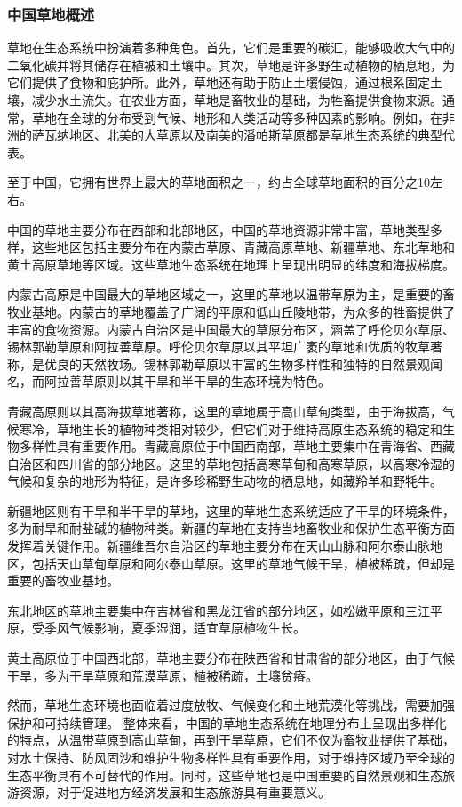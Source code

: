 \documentclass{article}
\begin{document}
	\subsubsection{中国草地概述}
	草地在生态系统中扮演着多种角色。首先，它们是重要的碳汇，能够吸收大气中的二氧化碳并将其储存在植被和土壤中。其次，草地是许多野生动植物的栖息地，为它们提供了食物和庇护所。此外，草地还有助于防止土壤侵蚀，通过根系固定土壤，减少水土流失。在农业方面，草地是畜牧业的基础，为牲畜提供食物来源。通常，草地在全球的分布受到气候、地形和人类活动等多种因素的影响。例如，在非洲的萨瓦纳地区、北美的大草原以及南美的潘帕斯草原都是草地生态系统的典型代表。
	
	至于中国，它拥有世界上最大的草地面积之一，约占全球草地面积的百分之10左右。
	
	中国的草地主要分布在西部和北部地区，中国的草地资源非常丰富，草地类型多样，这些地区包括主要分布在内蒙古草原、青藏高原草地、新疆草地、东北草地和黄土高原草地等区域。这些草地生态系统在地理上呈现出明显的纬度和海拔梯度。
	
	内蒙古高原是中国最大的草地区域之一，这里的草地以温带草原为主，是重要的畜牧业基地。内蒙古的草地覆盖了广阔的平原和低山丘陵地带，为众多的牲畜提供了丰富的食物资源。内蒙古自治区是中国最大的草原分布区，涵盖了呼伦贝尔草原、锡林郭勒草原和阿拉善草原。呼伦贝尔草原以其平坦广袤的草地和优质的牧草著称，是优良的天然牧场。锡林郭勒草原以丰富的生物多样性和独特的自然景观闻名，而阿拉善草原则以其干旱和半干旱的生态环境为特色。
	
	青藏高原则以其高海拔草地著称，这里的草地属于高山草甸类型，由于海拔高，气候寒冷，草地生长的植物种类相对较少，但它们对于维持高原生态系统的稳定和生物多样性具有重要作用。青藏高原位于中国西南部，草地主要集中在青海省、西藏自治区和四川省的部分地区。这里的草地包括高寒草甸和高寒草原，以高寒冷湿的气候和复杂的地形为特征，是许多珍稀野生动物的栖息地，如藏羚羊和野牦牛。
	
	新疆地区则有干旱和半干旱的草地，这里的草地生态系统适应了干旱的环境条件，多为耐旱和耐盐碱的植物种类。新疆的草地在支持当地畜牧业和保护生态平衡方面发挥着关键作用。新疆维吾尔自治区的草地主要分布在天山山脉和阿尔泰山脉地区，包括天山草甸草原和阿尔泰山草原。这里的草地气候干旱，植被稀疏，但却是重要的畜牧业基地。
	
	东北地区的草地主要集中在吉林省和黑龙江省的部分地区，如松嫩平原和三江平原，受季风气候影响，夏季湿润，适宜草原植物生长。
	
	黄土高原位于中国西北部，草地主要分布在陕西省和甘肃省的部分地区，由于气候干旱，多为干旱草原和荒漠草原，植被稀疏，土壤贫瘠。
	
	然而，草地生态环境也面临着过度放牧、气候变化和土地荒漠化等挑战，需要加强保护和可持续管理。 整体来看，中国的草地生态系统在地理分布上呈现出多样化的特点，从温带草原到高山草甸，再到干旱草原，它们不仅为畜牧业提供了基础，对水土保持、防风固沙和维护生物多样性具有重要作用，对于维持区域乃至全球的生态平衡具有不可替代的作用。同时，这些草地也是中国重要的自然景观和生态旅游资源，对于促进地方经济发展和生态旅游具有重要意义。
	
\end{document}
